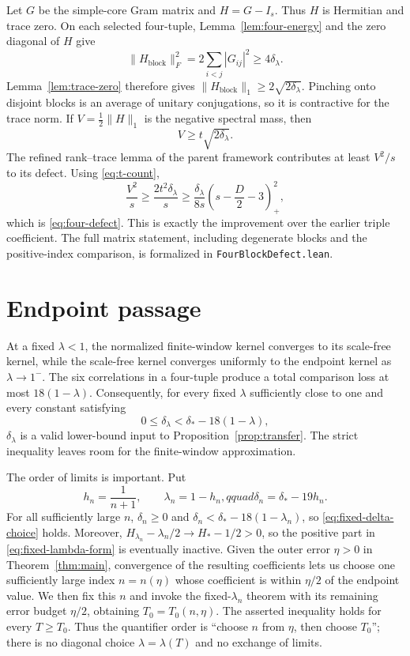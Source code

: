 \documentclass[11pt,reqno]{amsart}
\theoremstyle{definition}
\theoremstyle{remark}
\newcommand{\pos}[1]{(#1)_{+}}
\begin{document}
Let $G$ be the simple-core Gram matrix and $H=G-I_s$.  Thus $H$ is Hermitian
and trace zero.  On each selected four-tuple, Lemma~\ref{lem:four-energy}
and the zero diagonal of $H$ give
\[
 \|H_{\mathrm{block}}\|_F^2
 =2\sum_{i<j}|G_{ij}|^2\ge4\delta_\lambda.
\]
Lemma~\ref{lem:trace-zero} therefore gives
$\|H_{\mathrm{block}}\|_1\ge2\sqrt{2\delta_\lambda}$.
Pinching onto disjoint blocks is an average of unitary conjugations, so it is
contractive for the trace norm.  If
$V=\frac12\|H\|_1$ is the negative spectral mass, then
\[
 V\ge t\sqrt{2\delta_\lambda}.
\]
The refined rank--trace lemma of the parent framework contributes at least
$V^2/s$ to its defect.  Using \eqref{eq:t-count},
\[
 \frac{V^2}{s}\ge\frac{2t^2\delta_\lambda}{s}
 \ge\frac{\delta_\lambda}{8s}
 \pos{s-\frac D2-3}^{2},
\]
which is \eqref{eq:four-defect}.  This is exactly the improvement over the
earlier triple coefficient.  The full matrix statement, including degenerate
blocks and the positive-index comparison, is formalized in
\texttt{FourBlockDefect.lean}.

\section{Endpoint passage}\label{sec:endpoint}

At a fixed $\lambda<1$, the normalized finite-window kernel converges to its
scale-free kernel, while the scale-free kernel converges uniformly to the
endpoint kernel as $\lambda\to1^-$.  The six correlations in a four-tuple
produce a total comparison loss at most $18(1-\lambda)$.  Consequently, for
every fixed $\lambda$ sufficiently close to one and every constant satisfying
\begin{equation}\label{eq:fixed-delta-choice}
 0\le\delta_\lambda<\delta_*-18(1-\lambda),
\end{equation}
$\delta_\lambda$ is a valid lower-bound input to
Proposition~\ref{prop:transfer}.  The strict inequality leaves room for the
finite-window approximation.

The order of limits is important.  Put
\[
 h_n=\frac1{n+1},\qquad \lambda_n=1-h_n,qquad
 \delta_n=\delta_*-19h_n.
\]
For all sufficiently large $n$, $\delta_n\ge0$ and
$\delta_n<\delta_*-18(1-\lambda_n)$, so
\eqref{eq:fixed-delta-choice} holds.  Moreover,
$H_{\lambda_n}-\lambda_n/2\to H_*-1/2>0$, so the positive part in
\eqref{eq:fixed-lambda-form} is eventually inactive.  Given the outer error $\eta>0$ in
Theorem~\ref{thm:main}, convergence of the resulting coefficients lets us
choose one sufficiently large index $n=n(\eta)$ whose coefficient is within
$\eta/2$ of the endpoint value.  We then fix this $n$ and invoke the
fixed-$\lambda_n$ theorem with its remaining error budget $\eta/2$, obtaining
$T_0=T_0(n,\eta)$.  The asserted inequality holds for every $T\ge T_0$.
Thus the quantifier order is ``choose $n$ from $\eta$, then choose $T_0$'';
there is no diagonal choice $\lambda=\lambda(T)$ and no exchange of limits.
\end{document}
